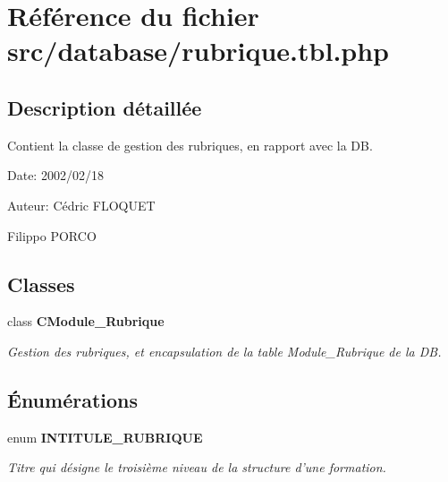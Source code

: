 \section{Référence du fichier src/database/rubrique.tbl.php}
\label{rubrique_8tbl_8php}


\subsection{Description détaillée}
Contient la classe de gestion des rubriques, en rapport avec la DB. 

\begin{Desc}
\item[Date:]2002/02/18\end{Desc}
\begin{Desc}
\item[Auteur:]Cédric FLOQUET 

Filippo PORCO \end{Desc}


\subsection*{Classes}
\begin{CompactItemize}
\item 
class {\bf CModule\_\-Rubrique}
\begin{CompactList}\small\item\em Gestion des rubriques, et encapsulation de la table Module\_\-Rubrique de la DB. \item\end{CompactList}\end{CompactItemize}
\subsection*{Énumérations}
\begin{CompactItemize}
\item 
enum {\bf INTITULE\_\-RUBRIQUE} 
\begin{CompactList}\small\item\em Titre qui désigne le troisième niveau de la structure d'une formation. \item\end{CompactList}\end{CompactItemize}
